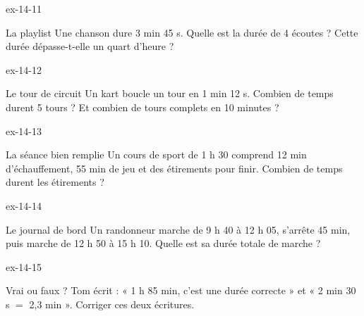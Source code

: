 \begin{blocLivre}{ex-14-11}\begin{exercice}[3]{La playlist}
Une chanson dure 3 min 45 s. Quelle est la durée de 4 écoutes ? Cette durée dépasse-t-elle un quart d’heure ?
\end{exercice}\end{blocLivre}
\begin{blocLivre}{ex-14-12}\begin{exercice}[3]{Le tour de circuit}
Un kart boucle un tour en 1 min 12 s. Combien de temps durent 5 tours ? Et combien de tours complets en 10 minutes ?
\end{exercice}\end{blocLivre}
\begin{blocLivre}{ex-14-13}\begin{exercice}[3]{La séance bien remplie}
Un cours de sport de 1 h 30 comprend 12 min d’échauffement, 55 min de jeu et des étirements pour finir. Combien de temps durent les étirements ?
\end{exercice}\end{blocLivre}
\begin{blocLivre}{ex-14-14}\begin{exercice}[3]{Le journal de bord}
Un randonneur marche de 9 h 40 à 12 h 05, s’arrête 45 min, puis marche de 12 h 50 à 15 h 10. Quelle est sa durée totale de marche ?
\end{exercice}\end{blocLivre}
\begin{blocLivre}{ex-14-15}\begin{exercice}[3]{Vrai ou faux ?}
Tom écrit : « 1 h 85 min, c’est une durée correcte » et « 2 min 30 s $=$ 2,3 min ». Corriger ces deux écritures.
\end{exercice}\end{blocLivre}

\clearpage
